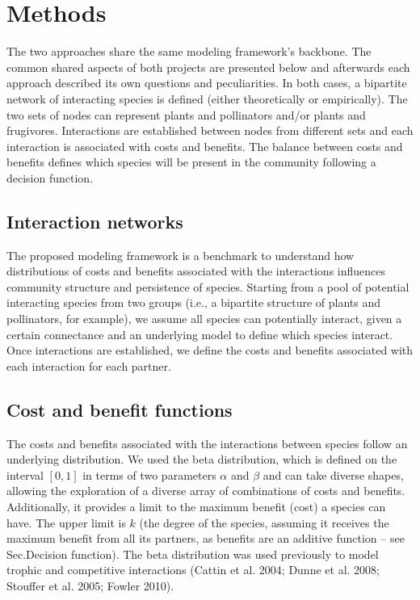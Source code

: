 \documentclass[
  letterpaper,
  DIV=11,
  numbers=noendperiod]{scrartcl}
\begin{document}
\section{Methods}\label{methods}

The two approaches share the same modeling framework's backbone. The
common shared aspects of both projects are presented below and
afterwards each approach described its own questions and peculiarities.
In both cases, a bipartite network of interacting species is defined
(either theoretically or empirically). The two sets of nodes can
represent plants and pollinators and/or plants and frugivores.
Interactions are established between nodes from different sets and each
interaction is associated with costs and benefits. The balance between
costs and benefits defines which species will be present in the
community following a decision function.

\subsection{Interaction networks}\label{interaction-networks}

The proposed modeling framework is a benchmark to understand how
distributions of costs and benefits associated with the interactions
influences community structure and persistence of species. Starting from
a pool of potential interacting species from two groups (i.e., a
bipartite structure of plants and pollinators, for example), we assume
all species can potentially interact, given a certain connectance and an
underlying model to define which species interact. Once interactions are
established, we define the costs and benefits associated with each
interaction for each partner.

\subsection{Cost and benefit
functions}\label{cost-and-benefit-functions}

The costs and benefits associated with the interactions between species
follow an underlying distribution. We used the beta distribution, which
is defined on the interval \([0,1]\) in terms of two parameters
\(\alpha\) and \(\beta\) and can take diverse shapes, allowing the
exploration of a diverse array of combinations of costs and benefits.
Additionally, it provides a limit to the maximum benefit (cost) a
species can have. The upper limit is \(k\) (the degree of the species,
assuming it receives the maximum benefit from all its partners, as
benefits are an additive function -- see
Sec.\label{decision-function}{Decision function}). The
beta distribution was used previously to model trophic and competitive
interactions (Cattin et al. 2004; Dunne et al. 2008; Stouffer et al.
2005; Fowler 2010).
\end{document}
